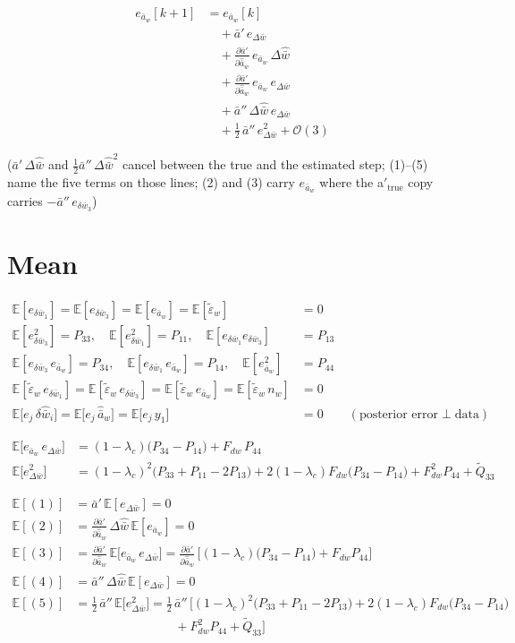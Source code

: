 \documentclass[11pt,a4paper,fontset=none]{ctexart}
\newcommand{\ba}{\bar{a}}
\newcommand{\bw}{\bar{w}}
\newcommand{\E}{\mathbb{E}}
\newcommand{\dWh}{\Delta\hat{\bw}}
\newcommand{\eD}{e_{\Delta\bw}}
\newcommand{\ap}{\ba'}
\newcommand{\app}{\ba''}
\newcommand{\et}{\tilde{\varepsilon}_w}
\newcommand{\dap}{\frac{\partial\ap}{\partial\hat{\ba}_w}}
\begin{document}
\begin{align*}
e_{\ba_w}[k+1] &= e_{\ba_w}[k] \\
               &\quad + \ap\,\eD \tag{1} \\
               &\quad + \dap\,e_{\ba_w}\,\dWh \tag{2} \\
               &\quad + \dap\,e_{\ba_w}\,\eD \tag{3} \\
               &\quad + \app\,\dWh\,\eD \tag{4} \\
               &\quad + \tfrac{1}{2}\,\app\,\eD^{2} + \mathcal{O}(3) \tag{5}
\end{align*}

($\ap\,\dWh$ and $\tfrac{1}{2}\app\,\dWh^{2}$ cancel between the true and the estimated step; (1)--(5) name the five terms on those lines;
(2) and (3) carry $e_{\ba_w}$ where the a$'_{\mathrm{true}}$ copy carries $-\app\,e_{\delta\bw_3}$)

\section{Mean}

\begin{align*}
\E[e_{\delta\bw_1}] = \E[e_{\delta\bw_3}] = \E[e_{\ba_w}] = \E[\et] &= 0 \\
\E[e_{\delta\bw_3}^{2}] = P_{33},\quad \E[e_{\delta\bw_1}^{2}] = P_{11},\quad \E[e_{\delta\bw_1}e_{\delta\bw_3}] &= P_{13} \\
\E[e_{\delta\bw_3}\,e_{\ba_w}] = P_{34},\quad \E[e_{\delta\bw_1}\,e_{\ba_w}] = P_{14},\quad \E[e_{\ba_w}^{2}] &= P_{44} \\
\E[\et\,e_{\delta\bw_1}] = \E[\et\,e_{\delta\bw_3}] = \E[\et\,e_{\ba_w}] = \E[\et\,n_w] &= 0 \\
\E\bigl[e_j\,\delta\hat{\bw}_i\bigr] = \E\bigl[e_j\,\hat{\ba}_w\bigr] = \E\bigl[e_j\,y_1\bigr] &= 0 \qquad (\text{posterior error} \perp \text{data})
\end{align*}

\begin{align*}
\E\bigl[e_{\ba_w}\,\eD\bigr] &= (1-\lambda_c)\bigl(P_{34} - P_{14}\bigr) + F_{dw}\,P_{44} \\
\E\bigl[\eD^{2}\bigr] &= (1-\lambda_c)^{2}\bigl(P_{33} + P_{11} - 2P_{13}\bigr)
   + 2(1-\lambda_c)F_{dw}\bigl(P_{34} - P_{14}\bigr) + F_{dw}^{2}P_{44} + \tilde{Q}_{33}
\end{align*}

\begin{align*}
\E[(1)] &= \ap\,\E[\eD] = 0 \\
\E[(2)] &= \dap\,\dWh\,\E[e_{\ba_w}] = 0 \\
\E[(3)] &= \dap\,\E\bigl[e_{\ba_w}\,\eD\bigr]
         = \dap\,\bigl[(1-\lambda_c)\bigl(P_{34} - P_{14}\bigr) + F_{dw}P_{44}\bigr] \\
\E[(4)] &= \app\,\dWh\,\E[\eD] = 0 \\
\E[(5)] &= \tfrac{1}{2}\,\app\,\E\bigl[\eD^{2}\bigr]
         = \tfrac{1}{2}\,\app\,\bigl[(1-\lambda_c)^{2}\bigl(P_{33} + P_{11} - 2P_{13}\bigr)
   + 2(1-\lambda_c)F_{dw}\bigl(P_{34} - P_{14}\bigr) \\
  &\qquad\qquad\qquad\qquad + F_{dw}^{2}P_{44} + \tilde{Q}_{33}\bigr]
\end{align*}
\end{document}
